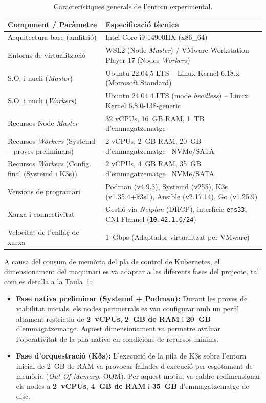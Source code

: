 \begin{table}[htbp]
    \centering
    \renewcommand{\arraystretch}{1.7}
    \begin{tabular}{p{5cm} p{10cm}}
        \hline
        \textbf{Component / Paràmetre} & \textbf{Especificació tècnica} \\ \hline
        Arquitectura base (amfitrió) & Intel Core i9-14900HX (x86\_64) \\
        Entorns de virtualització & WSL2 (Node \textit{Master}) / VMware Workstation Player 17 (Nodes \textit{Workers}) \\
        S.O. i nucli (\textit{Master}) & Ubuntu 22.04.5 LTS -- Linux Kernel 6.18.x (Microsoft Standard) \\
        S.O. i nucli (\textit{Workers}) & Ubuntu 24.04.4 LTS (mode \textit{headless}) -- Linux Kernel 6.8.0-138-generic \\
        Recursos Node \textit{Master} & 32 vCPUs, 16~GB RAM, 1~TB d'emmagatzematge \\
        Recursos \textit{Workers} \newline (Systemd – proves preliminars) & 2 vCPUs, 2~GB RAM, 20~GB d'emmagatzematge ~NVMe/SATA \\
        Recursos \textit{Workers} \newline (Config. final (Systemd i K3s)) & 2 vCPUs, 4~GB RAM, 35~GB d'emmagatzematge ~NVMe/SATA \\
        Versions de programari & Podman (v4.9.3), Systemd (v255), K3s (v1.35.4+k3s1), Ansible (v2.17.14), Go (v1.25.9) \\
        Xarxa i connectivitat & Gestió via \textit{Netplan} (DHCP), interfície \texttt{ens33}, CNI Flannel (\texttt{10.42.1.0/24}) \\
        Velocitat de l'enllaç de xarxa & 1~Gbps (Adaptador virtualitzat per VMware) \\ \hline
    \end{tabular}
    \caption{Característiques generals de l'entorn experimental.}
    \label{tab:testbed_general}
\end{table}

A causa del consum de memòria del pla de control de Kubernetes, el dimensionament del maquinari es va adaptar a les diferents fases del projecte, tal com es detalla a la Taula~\ref{tab:testbed_general}:
\begin{itemize}
    \item \textbf{Fase nativa preliminar (Systemd + Podman):} Durant les proves de viabilitat inicials, els nodes perimetrals es van configurar amb un perfil altament restrictiu de \textbf{2~vCPUs}, \textbf{2~GB de RAM} i \textbf{20~GB} d'emmagatzematge. Aquest dimensionament va permetre avaluar l'operativitat de la pila nativa en condicions de recursos mínims.
    \item \textbf{Fase d'orquestració (K3s):} L'execució de la pila de K3s sobre l'entorn inicial de 2~GB de RAM va provocar fallades d'execució per esgotament de memòria (\textit{Out-Of-Memory}, OOM). Per aquest motiu, va caldre redimensionar els nodes a \textbf{2~vCPUs}, \textbf{4~GB de RAM} i \textbf{35~GB} d'emmagatzematge de disc.
\end{itemize}

